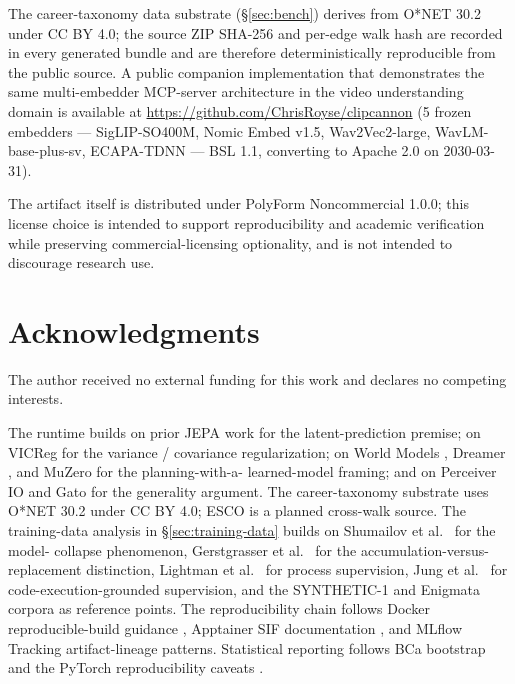 \documentclass[10pt,twocolumn,letterpaper]{article}
\begin{document}
The career-taxonomy data substrate
(\S\ref{sec:bench}) derives from O*NET 30.2
\cite{onet2026} under CC BY 4.0; the source ZIP SHA-256 and
per-edge walk hash are recorded in every generated bundle and
are therefore deterministically reproducible from the public
source. A public companion implementation that demonstrates the
same multi-embedder MCP-server architecture in the video
understanding domain is available at
\url{https://github.com/ChrisRoyse/clipcannon} (5 frozen
embedders --- SigLIP-SO400M, Nomic Embed v1.5, Wav2Vec2-large,
WavLM-base-plus-sv, ECAPA-TDNN --- BSL 1.1, converting to
Apache 2.0 on 2030-03-31).

The artifact itself is distributed under PolyForm
Noncommercial 1.0.0; this license choice is intended to
support reproducibility and academic verification while
preserving commercial-licensing optionality, and is not
intended to discourage research use.

\section{Acknowledgments}

The author received no external funding for this work and
declares no competing interests.

The runtime builds on prior JEPA work
\cite{assran2023ijepa,bardes2024vjepa,maes2026leworldmodel,chen2026vljepa}
for the latent-prediction premise; on VICReg
\cite{bardes2022vicreg} for the variance / covariance
regularization; on World Models
\cite{ha2018worldmodels}, Dreamer \cite{hafner2023dreamerv3}, and
MuZero \cite{schrittwieser2019muzero} for the planning-with-a-
learned-model framing; and on Perceiver IO
\cite{jaegle2022perceiverio} and Gato \cite{reed2022gato} for the
generality argument. The career-taxonomy substrate uses O*NET 30.2
\cite{onet2026} under CC BY 4.0; ESCO \cite{esco2025} is a planned
cross-walk source. The training-data analysis in
\S\ref{sec:training-data} builds on Shumailov et al.\
\cite{shumailov2023curse, shumailov2024nature} for the model-
collapse phenomenon, Gerstgrasser et al.\
\cite{gerstgrasser2024accumulate} for the accumulation-versus-
replacement distinction, Lightman et al.\
\cite{lightman2023verify} for process supervision, Jung et al.\
\cite{jung2025codeexec} for code-execution-grounded supervision,
and the SYNTHETIC-1 \cite{primeintellect2025synthetic1} and
Enigmata \cite{seed2025enigmata} corpora as reference points. The
reproducibility chain follows Docker reproducible-build guidance
\cite{docker2025reproducible, docker2024bestpractices}, Apptainer
SIF documentation \cite{apptainer2025buildsif}, and MLflow
Tracking \cite{mlflow2024} artifact-lineage patterns. Statistical
reporting follows BCa bootstrap \cite{efron2020automatic} and the
PyTorch reproducibility caveats \cite{pytorch2026reproducibility}.
\end{document}
